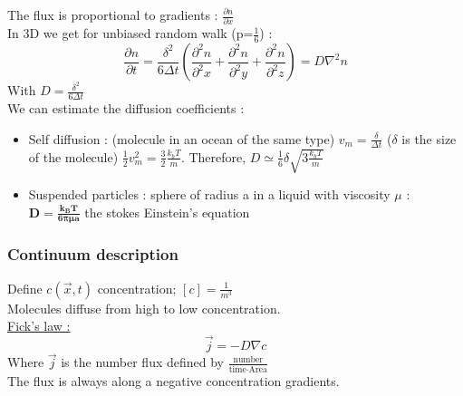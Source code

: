 \documentclass[../main.tex]{subfiles}
\begin{document}
The flux is proportional to gradients : $\frac{\partial n}{\partial x}$\\

In 3D we get for unbiased random walk (p=$\frac{1}{6}$) :\\
\begin{equation}
    \frac{\partial n}{\partial t} = \frac{\delta^2}{6 \Delta t}(\frac{\partial^2 n}{\partial^2 x} + \frac{\partial^2 n}{\partial^2 y} + \frac{\partial^2 n}{\partial^2 z}) = D \nabla^2 n
\end{equation}
With $D = \frac{\delta^2}{6 \Delta t}$\\

We can estimate the diffusion coefficients :\\
\begin{itemize}
    \item Self diffusion : (molecule in an ocean of the same type) $v_m = \frac{\delta}{\Delta t}$ ($\delta$ is the size of the molecule) $\frac{1}{2}v_m^2 = \frac{3}{2} \frac{k_b T}{m}$. Therefore, $D\simeq \frac{1}{6} \delta \sqrt{3\frac{k_b T}{m}}$\\
    \item Suspended particles : sphere of radius a in a liquid with viscosity $\mu$ : $\mathbf{D = \frac{k_B T}{6\pi \mu a}}$ the stokes Einstein's equation\\
\end{itemize}

\subsubsection{Continuum description}
Define $c(\Vec{x}, t)$ concentration; $[c] = \frac{1}{m^3}$\\
Molecules diffuse from high to low concentration.\\

\quad \underline{Fick's law :} \\
\begin{equation}
    \Vec{j} = -D \nabla c
\end{equation}
Where $\Vec{j}$ is the number flux defined by $\frac{\text{number}}{\text{time}\cdot \text{Area}}$\\

The flux is always along a negative concentration gradients.\\
\end{document}
